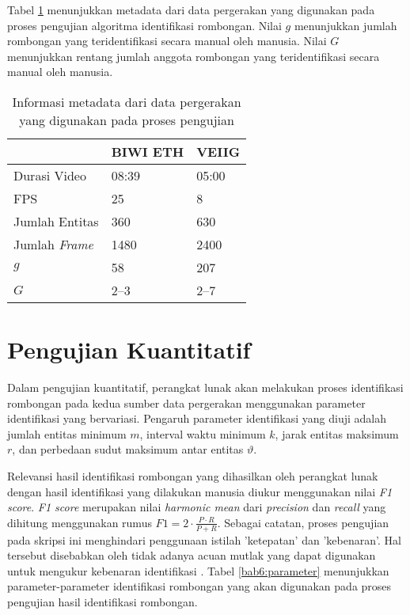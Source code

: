 Tabel \ref{bab6:metadata-pergerakan} menunjukkan metadata dari data pergerakan yang digunakan pada proses pengujian algoritma identifikasi rombongan. Nilai $g$ menunjukkan jumlah rombongan yang teridentifikasi secara manual oleh manusia. Nilai $G$ menunjukkan rentang jumlah anggota rombongan yang teridentifikasi secara manual oleh manusia.

\begin{table}[h]
    \centering
    \begin{tabular}{p{4cm} p{3cm} p{3cm}}
        \hline
        & \textbf{BIWI ETH} & \textbf{VEIIG} \\
        \hline
        Durasi Video & 08:39 & 05:00 \\
        FPS & 25 & 8 \\
        Jumlah Entitas & 360 & 630 \\
        Jumlah \textit{Frame} & 1480 & 2400 \\
        $g$ & 58 & 207 \\
        $G$ & 2--3 & 2--7 \\
        \hline
    \end{tabular}
    \caption[Metadata sumber data pergerakan]{Informasi metadata dari data pergerakan yang digunakan pada proses pengujian}
    \label{bab6:metadata-pergerakan}
\end{table}

\section{Pengujian Kuantitatif}
\label{sec:quantitative}

Dalam pengujian kuantitatif, perangkat lunak akan melakukan proses identifikasi rombongan pada kedua sumber data pergerakan menggunakan parameter identifikasi yang bervariasi. Pengaruh parameter identifikasi yang diuji adalah jumlah entitas minimum $m$, interval waktu minimum $k$, jarak entitas maksimum $r$, dan perbedaan sudut maksimum antar entitas $\vartheta$. 

Relevansi hasil identifikasi rombongan yang dihasilkan oleh perangkat lunak dengan hasil identifikasi yang dilakukan manusia diukur menggunakan nilai \textit{F1 score}. \textit{F1 score} merupakan nilai \textit{harmonic mean} dari \textit{precision} dan \textit{recall} yang dihitung menggunakan rumus $F1 = 2 \cdot \frac{P \cdot R}{P + R}$. Sebagai catatan, proses pengujian pada skripsi ini menghindari penggunaan istilah 'ketepatan' dan 'kebenaran'. Hal tersebut disebabkan oleh tidak adanya acuan mutlak yang dapat digunakan untuk mengukur kebenaran identifikasi \cite{wiratma:trajectory}. Tabel \ref{bab6:parameter} menunjukkan parameter-parameter identifikasi rombongan yang akan digunakan pada proses pengujian hasil identifikasi rombongan.

